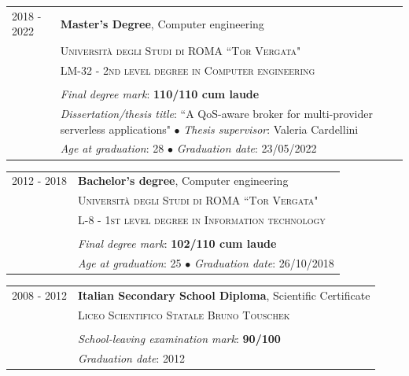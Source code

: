 \documentclass[english,10pt,a4paper]{article}
\newcommand{\CvEducation}[2]{ {\small \textit{#1}: #2}}
\newcommand{\CvBullet}{\hspace{0.05cm} \textcolor{CvColor}{$\bullet$} \hspace{0.05cm}}
\newcommand{\CvTimeRange}[2]{\textcolor{CvColor}{\textsc{#1 - #2}}}
\def\SidebarHSize{3.5cm}
\def\BodyHSize{11cm}
\begin{document}
	\begin{longtable}{p{\SidebarHSize}|p{\BodyHSize}}
		\CvTimeRange{2018}{2022} & \textbf{Master’s Degree}, Computer engineering \\
		& \textsc{Università degli Studi di ROMA ``Tor Vergata"} \\
		& \textsc{LM-32 - 2nd level degree in Computer engineering}\\
		& \\
		& \CvEducation{Final degree mark}{\textbf{110/110 cum laude}} \\
		& \CvEducation{Dissertation/thesis title}{``A QoS-aware broker for multi-provider serverless applications"} \CvBullet \CvEducation{Thesis supervisor}{Valeria Cardellini} \\
		& \CvEducation{Age at graduation}{28} \CvBullet \CvEducation{Graduation date}{23/05/2022}	
	\end{longtable}
	
	\begin{longtable}{p{\SidebarHSize}|p{\BodyHSize}}
		\CvTimeRange{2012}{2018} & \textbf{Bachelor's degree}, Computer engineering \\
		& \textsc{Università degli Studi di ROMA ``Tor Vergata"} \\
		& \textsc{L-8 - 1st level degree in Information technology}\\
		& \\
		& \CvEducation{Final degree mark}{\textbf{102/110 cum laude}} \\	
		& \CvEducation{Age at graduation}{25} \CvBullet \CvEducation{Graduation date}{26/10/2018}	
	\end{longtable}
		
	\begin{longtable}{p{\SidebarHSize}|p{\BodyHSize}}
		\CvTimeRange{2008}{2012} & \textbf{Italian Secondary School Diploma}, Scientific Certificate \\
		& \textsc{Liceo Scientifico Statale Bruno Touschek} \\	
		& \\
		& \CvEducation{School-leaving examination mark}{\textbf{90/100}} \\
		& \CvEducation{Graduation date}{2012}	
	\end{longtable}
\end{document}
